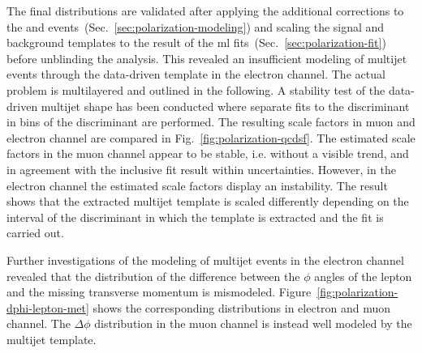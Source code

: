 The final distributions are validated after applying the additional corrections to the \wjets and \ttbar events~(Sec.~\ref{sec:polarization-modeling}) and scaling the signal and background templates to the result of the \gls{ml} fits~(Sec.~\ref{sec:polarization-fit}) before unblinding the analysis. This revealed an insufficient modeling of multijet events through the data-driven template in the electron channel. The actual problem is multilayered and outlined in the following. A stability test of the data-driven multijet shape has been conducted where separate fits to the \bdtqcd discriminant in bins of the \bdttch discriminant are performed. The resulting scale factors in muon and electron channel are compared in Fig.~\ref{fig:polarization-qcdsf}. The estimated scale factors in the muon channel appear to be stable, i.e. without a visible trend, and in agreement with the inclusive fit result within uncertainties. However, in the electron channel the estimated scale factors display an instability. The result shows that the extracted multijet template is scaled differently depending on the interval of the \bdttch discriminant in which the template is extracted and the fit is carried out. 


Further investigations of the modeling of multijet events in the electron channel revealed that the distribution of the difference between the $\phi$ angles of the lepton and the missing transverse momentum is mismodeled. Figure~\ref{fig:polarization-dphi-lepton-met} shows the corresponding distributions in electron and muon channel. The $\Delta\phi$ distribution in the muon channel is instead well modeled by the multijet template.



